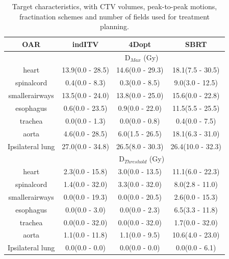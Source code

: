 \documentclass[type=dr, dr=rernat, accentcolor=tud7b,colorbacktitle, bigchapter, openright, twoside, 12pt ]{tudthesis}
\begin{document}
\begin{table}[H]
	\centering
	\caption{Target characteristics, with CTV volumes, peak-to-peak motions, fractination schemes and number of fields used for treatment planning.}
	\begin{tabular}{c|c|c|c}
		\hline\hline
		 
		OAR &  indITV & 4Dopt & SBRT \\
		\hline
		& \multicolumn{3}{c}{D$_{Max}$ (Gy)}  \\
		\hline
heart & 13.9(0.0 - 28.5) & 14.6(0.0 - 29.3) & 18.1(7.5 - 30.5)\\ 
spinalcord & 0.4(0.0 - 8.3) & 0.3(0.0 - 8.5) & 9.0(3.0 - 12.5)\\ 
smallerairways & 13.5(0.0 - 24.0) & 13.8(0.0 - 25.0) & 15.6(0.0 - 22.8)\\ 
esophagus & 0.6(0.0 - 23.5) & 0.9(0.0 - 22.0) & 11.5(5.5 - 25.5)\\ 
trachea &  0.0(0.0 - 1.3) & 0.0(0.0 - 0.8) & 0.4(0.0 - 7.5)\\ 
aorta &  4.6(0.0 - 28.5) & 6.0(1.5 - 26.5) & 18.1(6.3 - 31.0)\\ 
Ipsilateral lung & 27.0(0.0 - 34.8) & 26.5(8.0 - 30.3) & 26.4(10.0 - 32.3)\\ 

\hline\hline
& \multicolumn{3}{c}{D$_{Threshold}$ (Gy)} \\
\hline

heart &  2.3(0.0 - 15.8) & 3.0(0.0 - 13.5) & 11.1(6.0 - 22.3)\\ 
spinalcord & 1.4(0.0 - 32.0) & 3.3(0.0 - 32.0) & 8.0(2.8 - 11.0)\\ 
smallerairways &  0.0(0.0 - 19.3) & 0.0(0.0 - 20.5) & 2.6(0.0 - 15.3)\\ 
esophagus &  0.0(0.0 - 3.0) & 0.0(0.0 - 2.3) & 6.5(3.3 - 11.8)\\ 
trachea & 0.0(0.0 - 32.0) & 0.0(0.0 - 32.0) & 1.7(0.0 - 32.0)\\ 
aorta & 1.1(0.0 - 11.8) & 1.1(0.0 - 9.5) & 10.6(4.0 - 23.0)\\ 
Ipsilateral lung &  0.0(0.0 - 0.0) & 0.0(0.0 - 0.0) & 0.0(0.0 - 6.1)\\ 
\hline\hline
	\end{tabular}
	\label{tab:OARComplex}
\end{table}
\end{document}
